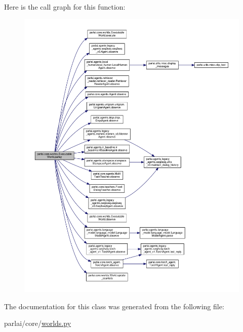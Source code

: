 Here is the call graph for this function\+:
\nopagebreak
\begin{figure}[H]
\begin{center}
\leavevmode
\includegraphics[width=350pt]{classparlai_1_1core_1_1worlds_1_1ExecutableWorld_a6555592d2b7c316e72febc1fccf43bdb_cgraph}
\end{center}
\end{figure}


The documentation for this class was generated from the following file\+:\begin{DoxyCompactItemize}
\item 
parlai/core/\hyperlink{parlai_2core_2worlds_8py}{worlds.\+py}\end{DoxyCompactItemize}
